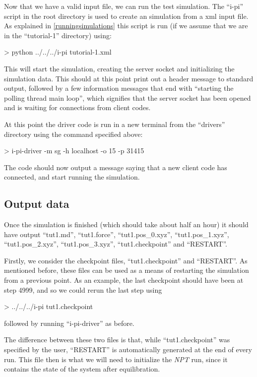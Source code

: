 \documentclass[11pt,english,fleqn]{report}
\newenvironment{code}{%
\footnotesize 
\verbatim
}{
\endverbatim
\normalsize
}
\begin{document}
\label{run1}

Now that we have a valid input file, we can run the test simulation.
The {}``i-pi'' script in the root directory is used to create an
\ipi simulation from a xml input file. As explained in
\ref{runningsimulations} this script is run 
(if we assume that we are in the {}``tutorial-1'' directory) using:

\begin{code}
> python ../../../i-pi tutorial-1.xml
\end{code}

This will start the \ipi simulation, creating the server socket and
initializing the simulation data. This should at this point print
out a header message to standard output, followed by a few information
messages that end with {}``starting the polling thread main loop'',
which signifies that the server socket has been opened and is waiting
for connections from client codes.

At this point the driver code is run in a new terminal 
from the {}``drivers'' directory using the command
specified above:

\begin{code}
> i-pi-driver -m sg -h localhost -o 15 -p 31415
\end{code}

The \ipi code should now output a message saying that a new client
code has connected, and start running the simulation.

\subsection{Output data}

Once the simulation is finished (which should take about half an hour)
it should have output {}``tut1.md'', {}``tut1.force'', {}``tut1.pos\_0.xyz'',
{}``tut1.pos\_1.xyz'', {}``tut1.pos\_2.xyz'', {}``tut1.pos\_3.xyz'',
{}``tut1.checkpoint'' and {}``RESTART''.

Firstly, we consider the checkpoint files, 
{}``tut1.checkpoint'' and {}``RESTART''.
As mentioned before, these files can be used as a means of restarting
the simulation from a previous point. As an example, the last
checkpoint should have been at step 4999, and so we could rerun
the last step using
\begin{code}
> ../../../i-pi tut1.checkpoint
\end{code}
followed by running {}``i-pi-driver'' as before.

The difference between these two files is that, while {}``tut1.checkpoint''
was specified by the user, {}``RESTART'' is automatically generated at the
end of every \ipi run. This file then is what we will need to initialize the
\emph{NPT} run, since it contains the state of the system after
equilibration.
\end{document}
